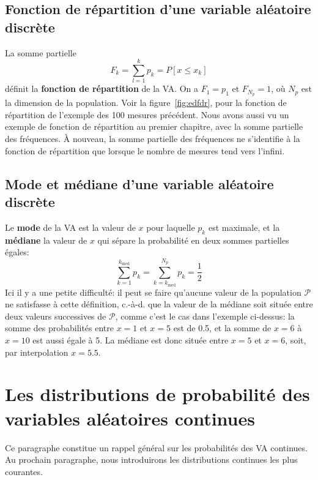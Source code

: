 \subsection{Fonction de répartition d'une variable aléatoire discrète}

La somme partielle
\begin{equation}
F_k=\sum_{l=1}^{k} p_k=P[x\le x_k]
\end{equation}
définit la \textbf{fonction de répartition} de la VA. On a $F_1=p_1$ et $F_{N_p}=1$, où $N_p$ est la dimension de la population. Voir la figure~\ref{fig:edfdr}, pour la fonction de répartition de l'exemple des 100 mesures précédent. Nous avons aussi vu un exemple de fonction de répartition au premier chapitre, avec la somme partielle des fréquences. À nouveau, la somme partielle des fréquences ne s'identifie à la fonction de répartition que lorsque le nombre de mesures tend vers l'infini.

\subsection{Mode et médiane d'une variable aléatoire discrète}

Le \textbf{mode} de la VA est la valeur de $x$ pour laquelle $p_k$ est maximale, et la \textbf{médiane} la valeur de $x$ qui sépare la probabilité en deux sommes partielles égales:
\begin{equation}
\sum_{k=1}^{k_{\text{med}}}p_k=\sum_{k=k_{\text{med}}}^{N_p}p_k=\frac{1}{2}
\end{equation}
Ici il y a une petite difficulté: il peut se faire qu'aucune valeur de la population $\mathcal{P}$ ne satisfasse à cette définition, c.-à-d. que la valeur de la médiane soit située entre deux valeurs successives de $\mathcal{P}$, comme c'est le cas dans l'exemple ci-dessus: la somme des probabilités entre $x=1$ et $x=5$ est de 0.5, et la somme de $x=6$ à $x=10$ est aussi égale à 5. La médiane est donc située entre $x=5$ et $x=6$, soit, par interpolation $x=5.5$.

\section{Les distributions de probabilité des variables aléatoires continues}

Ce paragraphe constitue un rappel général sur les probabilités des VA continues. Au prochain paragraphe, nous introduirons les distributions continues les plus courantes.

